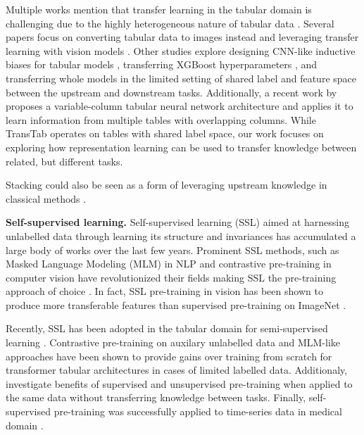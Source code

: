 Multiple works mention that transfer learning in the tabular domain is challenging due to the highly heterogeneous nature of tabular data \citep{jain2021deep, lewinson2020python}. Several papers focus on converting tabular data to images instead \citep{sharma2019deepinsight, zhu2021converting, sun2019supertml} and leveraging transfer learning with vision models \citep{sun2019supertml}. Other studies explore designing CNN-like inductive biases for tabular models \citep{joffe2021transfer}, transferring XGBoost hyperparameters \citep{woznica2022consolidated, metaMIMIC_github}, and transferring whole models \citep{fang2019adapted, al2011adaptive, li2021ttnet} in the limited setting of shared label and feature space between the upstream and downstream tasks. Additionally, a recent work by \cite{wang2022transtab} proposes a variable-column tabular neural network architecture and applies it to learn information from multiple tables with overlapping columns. While TransTab operates on tables with shared label space, our work focuses on exploring how representation learning can be used to transfer knowledge between related, but different tasks.

Stacking could also be seen as a form of leveraging upstream knowledge in classical methods \citep{wolpert1992stacked, ting1997stacked}.

{\bf Self-supervised learning.} Self-supervised learning (SSL) aimed at harnessing unlabelled data through learning its structure and invariances has accumulated a large body of works over the last few years. Prominent SSL methods, such as Masked Language Modeling (MLM) \citep{devlin2019bert} in NLP and contrastive pre-training in computer vision \citep{chen2020simple} have revolutionized their fields making SSL the pre-training approach of choice \citep{devlin2019bert, lan2019albert, liu2019roberta, lewis2019bart, chen2020simple, he2020momentum, caron2020unsupervised, bardes2021vicreg, misra2020self}. In fact, SSL pre-training in vision has been shown to produce more transferable features than supervised pre-training on ImageNet \citep{he2020momentum}. 

Recently, SSL has been adopted in the tabular domain for semi-supervised learning \citep{yin2020tabert, yoon2020vime, ucar2021subtab, somepalli2021saint, huang2020tabtransformer}. Contrastive pre-training on auxilary unlabelled data \citep{somepalli2021saint} and MLM-like approaches \citep{huang2020tabtransformer} have been shown to provide gains over training from scratch for transformer tabular architectures in cases of limited labelled data. Additionaly, \cite{rubachev2022revisiting} investigate benefits of supervised and unsupervised pre-training when applied to the same data without transferring knowledge between tasks. Finally, self-supervised pre-training was successfully applied to time-series data in medical domain \citep{yeche2021neighborhood, mcdermott2021comprehensive}.

